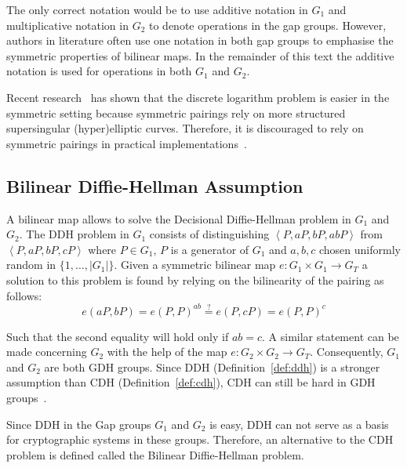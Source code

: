 The only correct notation would be to use additive notation in $G_1$ and multiplicative notation in $G_2$ to denote operations in the gap groups. However, authors in literature often use one notation in both gap groups to emphasise the symmetric properties of bilinear maps. In the remainder of this text the additive notation is used for operations in both $G_1$ and $G_2$.

Recent research~\cite{art:AdjMOR13,art:BarbulescuGJT14,art:Joux13} has shown that the discrete logarithm problem is easier in the symmetric setting because symmetric pairings rely on more structured supersingular (hyper)elliptic curves. Therefore, it is discouraged to rely on symmetric pairings in practical implementations~\cite{art:ZhangW13}.

\subsection{Bilinear Diffie-Hellman Assumption}
A bilinear map allows to solve the Decisional Diffie-Hellman problem in $G_1$ and $G_2$. The DDH problem in $G_1$ consists of distinguishing $\left< P, aP, bP, abP \right>$ from $\left< P, aP, bP, cP \right>$ where $P \in G_1$, $P$ is a generator of $G_1$ and $a, b, c$ chosen uniformly random in $\{1, \ldots, \vert G_1 \vert \}$. Given a symmetric bilinear map $e: G_1 \times G_1 \rightarrow G_T$ a solution to this problem is found by relying on the bilinearity of the pairing as follows:
\medskip
\begin{equation*}
 e \left( aP, bP \right) = e \left( P, P \right)^{ab} \stackrel{?}{=} e \left( P, cP \right) = e \left( P, P\right)^c
\end{equation*}
\medskip

Such that the second equality will hold only if $ab = c$. A similar statement can be made concerning $G_2$ with the help of the map $e: G_2 \times G_2 \rightarrow G_T$. Consequently, $G_1$ and $G_2$ are both GDH groups. Since DDH (Definition~\ref{def:ddh}) is a stronger assumption than CDH (Definition~\ref{def:cdh}), CDH can still be hard in GDH groups~\cite{art:BonehF01}.

Since DDH in the Gap groups $G_1$ and $G_2$ is easy, DDH can not serve as a basis for cryptographic systems in these groups. Therefore, an alternative to the CDH problem is defined called the Bilinear Diffie-Hellman problem.

